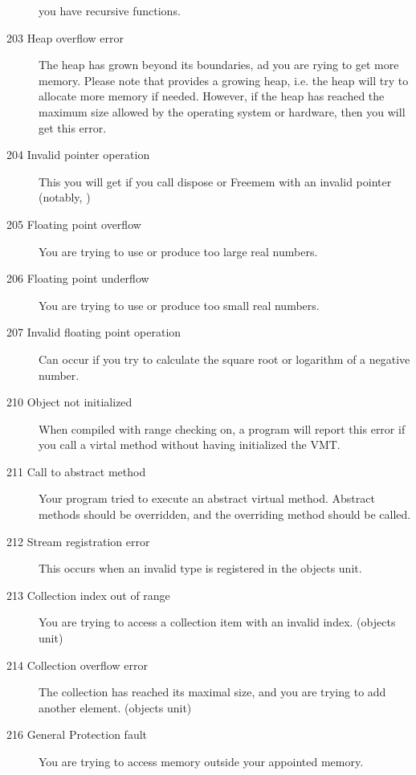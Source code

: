 \documentclass{report}
\begin{document}
\begin{description}
you have recursive functions. 
\item [203  Heap overflow error]
The heap has grown beyond its boundaries, ad you are rying to get more
memory. Please note that \fpk provides a growing heap, i.e. the heap will
try to allocate more memory if needed. However, if the heap has reached the
maximum size allowed by the operating system or hardware, then you will get
this error.
\item [204  Invalid pointer operation]
This you will get if you call dispose or Freemem with an invalid pointer
(notably, )
\item [205  Floating point overflow]
You are trying to use or produce too large real numbers. 
\item [206  Floating point underflow]
You are trying to use or produce too small real numbers. 
\item [207  Invalid floating point operation]
Can occur if you try to calculate the square root or logarithm of a negative
number.
\item [210  Object not initialized]
When compiled with range checking on, a program will report this error if
you call a virtal method without having initialized the VMT.
\item [211  Call to abstract method]
Your program tried to execute an abstract virtual method. Abstract methods
should be overridden, and the overriding method should be called.
\item [212  Stream registration error]
This occurs when an invalid type is registered in the objects unit.
\item [213  Collection index out of range]
You are trying to access a collection item with an invalid index.
(objects unit) 
\item [214  Collection overflow error]
The collection has reached its maximal size, and you are trying to add
another element. (objects unit)
\item [216  General Protection fault]
You are trying to access memory outside your appointed memory.
\end{description}
\end{document}
